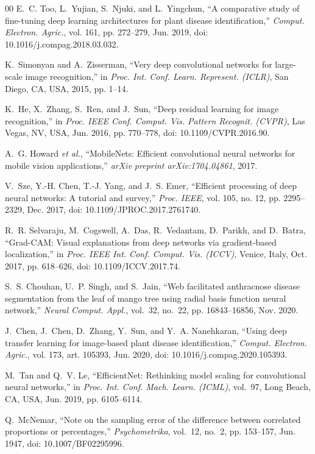 \documentclass[journal]{IEEEtran}
\begin{document}
\begin{thebibliography}{00}
E.~C. Too, L.~Yujian, S.~Njuki, and L.~Yingchun, ``A comparative study of fine-tuning deep learning architectures for plant disease identification,'' \textit{Comput. Electron. Agric.}, vol. 161, pp. 272--279, Jun. 2019, doi: 10.1016/j.compag.2018.03.032.

K.~Simonyan and A.~Zisserman, ``Very deep convolutional networks for large-scale image recognition,'' in \textit{Proc. Int. Conf. Learn. Represent. (ICLR)}, San Diego, CA, USA, 2015, pp. 1--14.

K.~He, X.~Zhang, S.~Ren, and J.~Sun, ``Deep residual learning for image recognition,'' in \textit{Proc. IEEE Conf. Comput. Vis. Pattern Recognit. (CVPR)}, Las Vegas, NV, USA, Jun. 2016, pp. 770--778, doi: 10.1109/CVPR.2016.90.

A.~G. Howard \textit{et al.}, ``MobileNets: Efficient convolutional neural networks for mobile vision applications,'' \textit{arXiv preprint arXiv:1704.04861}, 2017.

V.~Sze, Y.-H. Chen, T.-J. Yang, and J.~S. Emer, ``Efficient processing of deep neural networks: A tutorial and survey,'' \textit{Proc. IEEE}, vol. 105, no. 12, pp. 2295--2329, Dec. 2017, doi: 10.1109/JPROC.2017.2761740.

R.~R. Selvaraju, M.~Cogswell, A.~Das, R.~Vedantam, D.~Parikh, and D.~Batra, ``Grad-CAM: Visual explanations from deep networks via gradient-based localization,'' in \textit{Proc. IEEE Int. Conf. Comput. Vis. (ICCV)}, Venice, Italy, Oct. 2017, pp. 618--626, doi: 10.1109/ICCV.2017.74.

S.~S. Chouhan, U.~P. Singh, and S.~Jain, ``Web facilitated anthracnose disease segmentation from the leaf of mango tree using radial basis function neural network,'' \textit{Neural Comput. Appl.}, vol.~32, no.~22, pp. 16843--16856, Nov. 2020.

J.~Chen, J.~Chen, D.~Zhang, Y.~Sun, and Y.~A. Nanehkaran, ``Using deep transfer learning for image-based plant disease identification,'' \textit{Comput. Electron. Agric.}, vol. 173, art. 105393, Jun. 2020, doi: 10.1016/j.compag.2020.105393.

M.~Tan and Q.~V. Le, ``EfficientNet: Rethinking model scaling for convolutional neural networks,'' in \textit{Proc. Int. Conf. Mach. Learn. (ICML)}, vol.~97, Long Beach, CA, USA, Jun. 2019, pp. 6105--6114.

Q.~McNemar, ``Note on the sampling error of the difference between correlated proportions or percentages,'' \textit{Psychometrika}, vol.~12, no.~2, pp. 153--157, Jun. 1947, doi: 10.1007/BF02295996.


\end{thebibliography}
\end{document}
